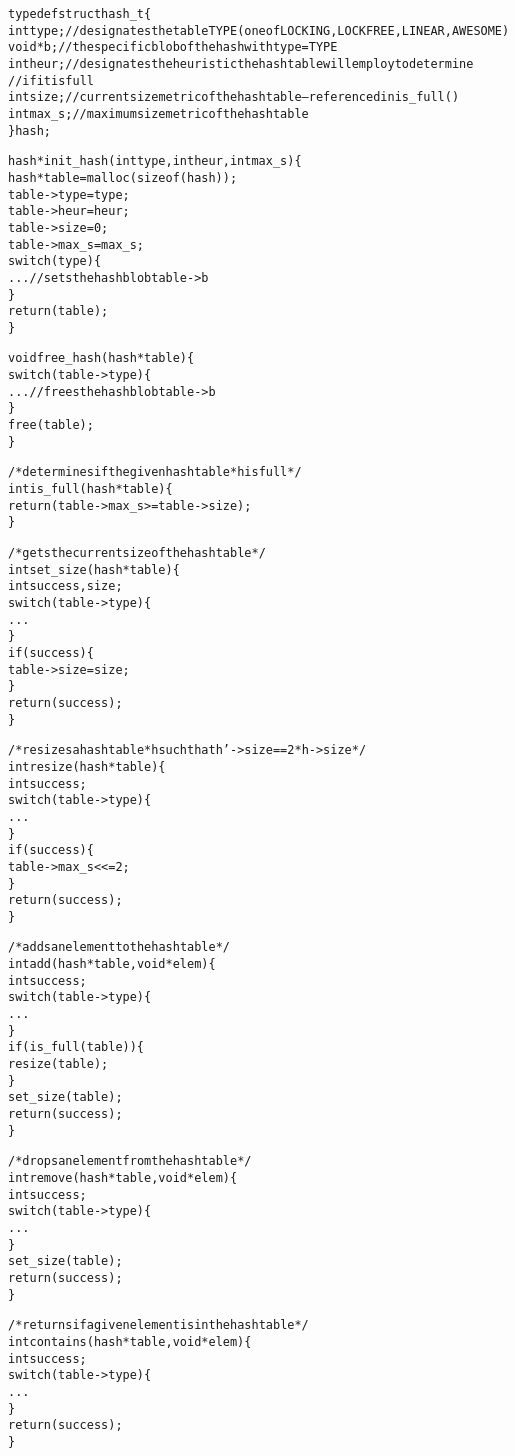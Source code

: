 \documentclass{article}
\newcommand{\cpart}[1]{\newblock{\LARGE {\\\\#1}}}
\begin{document}
\begin{alltt}

typedef struct hash_t \{
  int type;     // designates the table TYPE (oneof LOCKING, LOCKFREE, LINEAR, AWESOME)
  void *b;      // the specific blob of the hash with type = TYPE
  int heur;     // designates the heuristic the hash table will employ to determine
                //   if it is full
  int size;     // current size metric of the hash table -- referenced in is_full()
  int max_s;    // maximum size metric of the hash table
\} hash;

hash *init_hash(int type, int heur, int max_s) \{
  hash *table = malloc(sizeof(hash));
  table->type = type;
  table->heur = heur;
  table->size = 0;
  table->max_s = max_s;
  switch(type) \{
    ...         // sets the hash blob table->b
  \}
  return(table);
\}

void free_hash(hash *table) \{
  switch(table->type) \{
    ...  	// frees the hash blob table->b
  \}
  free(table);
\}

/* determines if the given hash table *h is full */
int is_full(hash *table) \{
  return(table->max_s >= table->size);
\}

/* gets the current size of the hash table */
int set_size(hash *table) \{
  int success, size;
  switch(table->type) \{
    ...
  \}
  if(success) \{
    table->size = size;
  \}
  return(success);
\}

/* resizes a hash table *h such that h'->size == 2 * h->size */
int resize(hash *table) \{
  int success;
  switch(table->type) \{
    ...
  \}
  if(success) \{
    table->max_s <<= 2;
  \}
  return(success);
\}

/* adds an element to the hash table */
int add(hash *table, void *elem) \{
  int success;
  switch(table->type) \{
    ...
  \}
  if(is_full(table)) \{
    resize(table);
  \}
  set_size(table);
  return(success);
\}

/* drops an element from the hash table */
int remove(hash *table, void *elem) \{
  int success;
  switch(table->type) \{
    ...
  \}
  set_size(table);
  return(success);
\}

/* returns if a given element is in the hash table */
int contains(hash *table, void *elem) \{
  int success;
  switch(table->type) \{
    ...
  \}
  return(success);
\}

\end{alltt}

\cpart{Experiment Interfaces}
\end{document}
